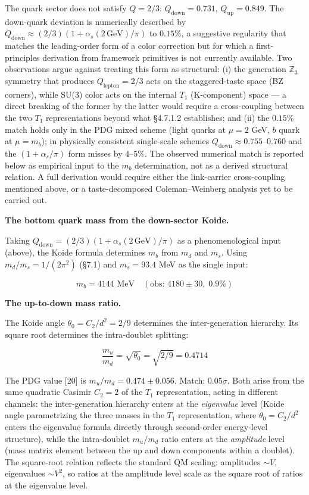 \documentclass[
]{article}
\begin{document}
The quark sector does not satisfy \(Q = 2/3\):
\(Q_{\text{down}} = 0.731\), \(Q_{\text{up}} = 0.849\). The down-quark
deviation is numerically described by
\(Q_{\text{down}} \approx (2/3)(1 + \alpha_s(2\,\text{GeV})/\pi)\) to
\(0.15\%\), a suggestive regularity that matches the leading-order form
of a color correction but for which a first-principles derivation from
framework primitives is not currently available. Two observations argue
against treating this form as structural: (i) the generation
\(\mathbb{Z}_3\) symmetry that produces \(Q_{\text{lepton}} = 2/3\) acts
on the staggered-taste space (BZ corners), while SU(3) color acts on the
internal \(T_1\) (K-component) space --- a direct breaking of the former
by the latter would require a cross-coupling between the two \(T_1\)
representations beyond what §4.7.1.2 establishes; and (ii) the
\(0.15\%\) match holds only in the PDG mixed scheme (light quarks at
\(\mu = 2\) GeV, \(b\) quark at \(\mu = m_b\)); in physically consistent
single-scale schemes \(Q_{\text{down}} \approx 0.755\)--\(0.760\) and
the \((1+\alpha_s/\pi)\) form misses by \(4\)--\(5\%\). The observed
numerical match is reported below as empirical input to the \(m_b\)
determination, not as a derived structural relation. A full derivation
would require either the link-carrier cross-coupling mentioned above, or
a taste-decomposed Coleman--Weinberg analysis yet to be carried out.

\textbf{The bottom quark mass from the down-sector Koide.}

Taking \(Q_{\text{down}} = (2/3)(1 + \alpha_s(2\,\text{GeV})/\pi)\) as a
phenomenological input (above), the Koide formula determines \(m_b\)
from \(m_d\) and \(m_s\). Using \(m_d/m_s = 1/(2\pi^2)\) (§7.1) and
\(m_s = 93.4\) MeV as the single input:

\[\boxed{m_b = 4144 \text{ MeV} \quad (\text{obs: } 4180 \pm 30, \; 0.9\%)}\]

\textbf{The up-to-down mass ratio.}

The Koide angle \(\theta_0 = C_2/d^2 = 2/9\) determines the
inter-generation hierarchy. Its square root determines the intra-doublet
splitting:

\[\boxed{\frac{m_u}{m_d} = \sqrt{\theta_0} = \sqrt{2/9} = 0.4714}\]

The PDG value {[}20{]} is \(m_u/m_d = 0.474 \pm 0.056\). Match:
\(0.05\sigma\). Both arise from the same quadratic Casimir \(C_2 = 2\)
of the \(T_1\) representation, acting in different channels: the
inter-generation hierarchy enters at the \emph{eigenvalue} level (Koide
angle parametrizing the three masses in the \(T_1\) representation,
where \(\theta_0 = C_2/d^2\) enters the eigenvalue formula directly
through second-order energy-level structure), while the intra-doublet
\(m_u/m_d\) ratio enters at the \emph{amplitude} level (mass matrix
element between the up and down components within a doublet). The
square-root relation reflects the standard QM scaling: amplitudes
\(\sim V\), eigenvalues \(\sim V^2\), so ratios at the amplitude level
scale as the square root of ratios at the eigenvalue level.
\end{document}
